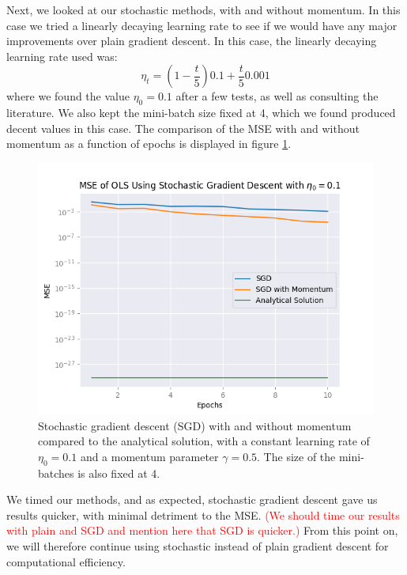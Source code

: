 Next, we looked at our stochastic methods, with and without momentum. In this case we tried a linearly decaying learning rate to see if we would have any major improvements over plain gradient descent. In this case, the linearly decaying learning rate used was:
\[
\eta_t = (1- \frac{t}{5})0.1 + \frac{t}{5} 0.001
\]
where we found the value $\eta_0 = 0.1$ after a few tests, as well as consulting the literature. We also kept the mini-batch size fixed at 4, which we found produced decent values in this case. The comparison of the MSE with and without momentum as a function of epochs is displayed in figure \ref{fig:sgdVSanalytical}. 
\begin{figure}
    \centering
    \includegraphics[width=\linewidth]{figures/all_plots/sgd_mse_pr_epoch_eta_1e-1.png}
    \caption{Stochastic gradient descent (SGD) with and without momentum compared to the analytical solution, with a constant learning rate of $\eta_0 = 0.1$ and a momentum parameter $\gamma = 0.5$. The size of the mini-batches is also fixed at 4.}
    \label{fig:sgdVSanalytical}
\end{figure}

We timed our methods, and as expected, stochastic gradient descent gave us results quicker, with minimal detriment to the MSE. \textcolor{red}{(We should time our results with plain and SGD and mention here that SGD is quicker.)} From this point on, we will therefore continue using stochastic instead of plain gradient descent for computational efficiency.

